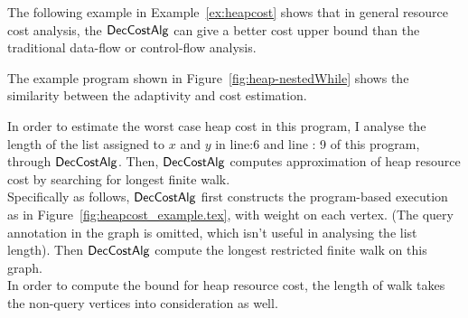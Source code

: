 The following example in Example~\ref{ex:heapcost} shows that in general 
resource cost analysis, the $\textsf{DecCostAlg}$  can give a better cost upper bound than the traditional 
data-flow or control-flow analysis.
\begin{example}
  \label{ex:whileNested}
The example program shown in Figure~\ref{fig:heap-nestedWhile} shows the similarity
between the adaptivity and cost estimation.

In order to estimate the worst case heap cost in this program, I analyse the length 
of the list assigned to $x$ and $y$ in line:6 and line : 9 of this program, through $\textsf{DecCostAlg}$.
Then,  $\textsf{DecCostAlg}$ computes approximation
of heap resource cost by searching for longest finite walk.
\\
Specifically as follows, 
$\textsf{DecCostAlg}$ first constructs the program-based execution as in Figure~\ref{fig:heapcost_example.tex},
with weight on each vertex. (The query annotation in the graph is omitted, which isn't useful in analysing the 
list length).
Then $\textsf{DecCostAlg}$ compute the longest restricted finite walk on this graph.
\\
In order to compute the bound for heap resource cost, the length of walk takes the non-query vertices into consideration as 
well. 


\end{example}
